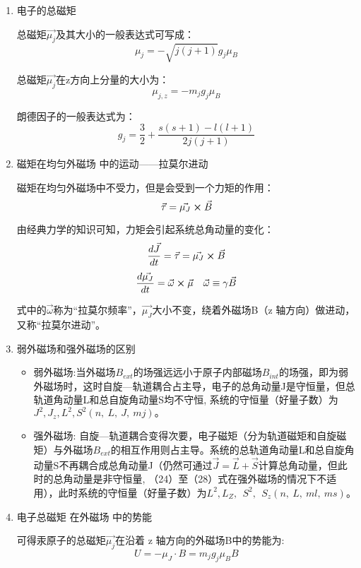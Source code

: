 \documentclass[dvipsnames, svgnames,a4paper,11pt]{article}
\begin{document}
		\begin{enumerate}
			\item 电子的总磁矩
			
				总磁矩$\vec{\mu_j}$及其大小的一般表达式可写成：
					\[
						\mu_j = -\sqrt{j(j+1)}g_j \mu_B
					\]

				总磁矩$\vec{\mu_j}$在z方向上分量的大小为：
					\[
						\mu_{j,z} = - m_j g_j \mu_B	
					\]

				朗德因子的一般表达式为：
					\[
						g_j=\frac{3}{2}+\frac{s\left(s+1\right)-l\left(l+1\right)}{2j\left(j+1\right)}	
					\]

			\item 磁矩在均匀外磁场 中的运动——拉莫尔进动
			
				磁矩在均匀外磁场中不受力，但是会受到一个力矩的作用：
				\[
					\vec{\tau} = \vec{\mu_J} \cross \vec{B}	
				\]

				由经典力学的知识可知，力矩会引起系统总角动量的变化：
				\[
					\frac{d \vec{J}}{d t} = \vec{\tau} = \vec{\mu_J} \cross \vec{B}
				\]
				\[
					\frac{d \vec{\mu_J}}{d t} = \vec{\omega} \cross \vec{\mu} \quad \vec{\omega} \equiv \gamma \vec{B}
				\]
				
				式中的$\vec{\omega}$称为“拉莫尔频率”，$\vec{\mu_J}$大小不变，绕着外磁场B（z 轴方向）做进动，又称“拉莫尔进动”。

			\item 弱外磁场和强外磁场的区别
			
				\begin{itemize}
					\item 弱外磁场:当外磁场$B_{ext}$的场强远远小于原子内部磁场$B_{int}$的场强，即为弱外磁场时，这时自旋—轨道耦合占主导，电子的总角动量J是守恒量，但总轨道角动量L和总自旋角动量S均不守恒, 系统的守恒量（好量子数）为$J^2,J_z,L^2,S^2\left(n,\ L,\ J,\ mj\right)。$
					\item 强外磁场: 自旋—轨道耦合变得次要，电子磁矩（分为轨道磁矩和自旋磁矩）与外磁场$B_{ext}$的相互作用则占主导。系统的总轨道角动量L和总自旋角动量S不再耦合成总角动量J（仍然可通过$\vec{J}=\vec{L}+\vec{S}$计算总角动量，但此时的总角动量是非守恒量, （24）至（28）式在强外磁场的情况下不适用），此时系统的守恒量（好量子数）为$L^2,L_Z,\ \ S^2,\ {\ S}_z\left(n,\ L,\ ml,\ ms\right)$。
				\end{itemize}
			
			\item 电子总磁矩 在外磁场 中的势能
			
				可得汞原子的总磁矩$\vec{\mu_j}$在沿着 z 轴方向的外磁场B中的势能为:
				\[
					U=-\mu_J \cdot B=m_jg_j\mu_B B	
				\]


		\end{enumerate}
\end{document}
